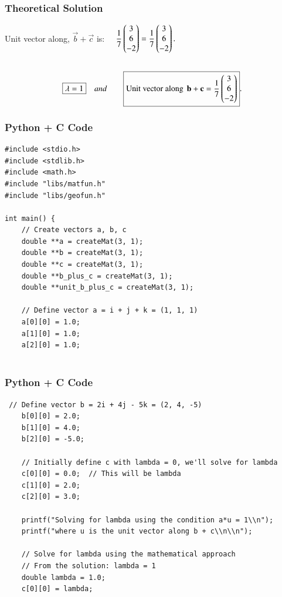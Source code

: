 \documentclass{beamer}
\begin{document}
\begin{frame}[fragile]
    \frametitle{Theoretical Solution}
Unit vector along, $\vec{b}+\vec{c}$ is: $\quad \dfrac{1}{7}\begin{pmatrix}3\\6\\-2\end{pmatrix}
= \dfrac{1}{7}\begin{pmatrix}3\\6\\-2\end{pmatrix}.$\\\\
\bigskip
\begin{align}   
\centering
\boxed{\lambda=1} \quad and \qquad 
\boxed{\text{Unit vector along }\,\vec{b}+\vec{c}
=\dfrac{1}{7}\myvec{3\\6\\-2}}.
\end{align}
\end{frame}


\begin{frame}[fragile]
    \frametitle{Python + C Code}
    \begin{lstlisting}
#include <stdio.h>
#include <stdlib.h>
#include <math.h>
#include "libs/matfun.h"
#include "libs/geofun.h"

int main() {
    // Create vectors a, b, c
    double **a = createMat(3, 1);
    double **b = createMat(3, 1);
    double **c = createMat(3, 1);
    double **b_plus_c = createMat(3, 1);
    double **unit_b_plus_c = createMat(3, 1);
    
    // Define vector a = i + j + k = (1, 1, 1)
    a[0][0] = 1.0;
    a[1][0] = 1.0;
    a[2][0] = 1.0;
    
    \end{lstlisting}
\end{frame}


\begin{frame}[fragile]
    \frametitle{Python + C Code}
    \begin{lstlisting}
 // Define vector b = 2i + 4j - 5k = (2, 4, -5)
    b[0][0] = 2.0;
    b[1][0] = 4.0;
    b[2][0] = -5.0;
    
    // Initially define c with lambda = 0, we'll solve for lambda
    c[0][0] = 0.0;  // This will be lambda
    c[1][0] = 2.0;
    c[2][0] = 3.0;
    
    printf("Solving for lambda using the condition a*u = 1\\n");
    printf("where u is the unit vector along b + c\\n\\n");
    
    // Solve for lambda using the mathematical approach
    // From the solution: lambda = 1
    double lambda = 1.0;
    c[0][0] = lambda;
    
    \end{lstlisting}
\end{frame}
\end{document}
